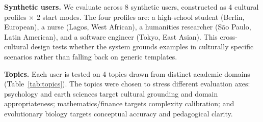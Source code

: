 \documentclass[conference]{IEEEtran}
\begin{document}
\textbf{Synthetic users.} We evaluate across 8 synthetic users, constructed as 4 cultural profiles $\times$ 2 start modes. The four profiles are: a high-school student (Berlin, European), a nurse (Lagos, West African), a humanities researcher (S\~{a}o Paulo, Latin American), and a software engineer (Tokyo, East Asian). This cross-cultural design tests whether the system grounds examples in culturally specific scenarios rather than falling back on generic templates.

\textbf{Topics.} Each user is tested on 4 topics drawn from distinct academic domains (Table~\ref{tab:topics}). The topics were chosen to stress different evaluation axes: psychology and earth sciences target cultural grounding and domain appropriateness; mathematics/finance targets complexity calibration; and evolutionary biology targets conceptual accuracy and pedagogical clarity.
\end{document}
